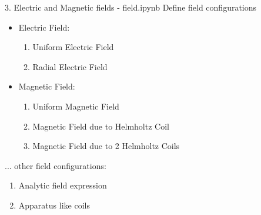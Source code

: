\documentclass{beamer}
\begin{document}
	\begin{frame}[t]{3. Electric and Magnetic fields - field.ipynb}
		Define field configurations \\
		\vspace{0.5cm}
		\begin{itemize}
			\item Electric Field:
			\begin{enumerate}
				\item Uniform Electric Field
				\item Radial Electric Field
			\end{enumerate}
			\item Magnetic Field: 
			\begin{enumerate}
				\item Uniform Magnetic Field
				\item Magnetic Field due to Helmholtz Coil
				\item Magnetic Field due to 2 Helmholtz Coils
			\end{enumerate}
		\end{itemize}
	... other field configurations:
	\begin{enumerate}
		\item Analytic field expression
		\item Apparatus like coils
	\end{enumerate}
	\end{frame}
	\begin{frame}
		
	\end{frame}
	\begin{frame}
		
	\end{frame}
\end{document}
